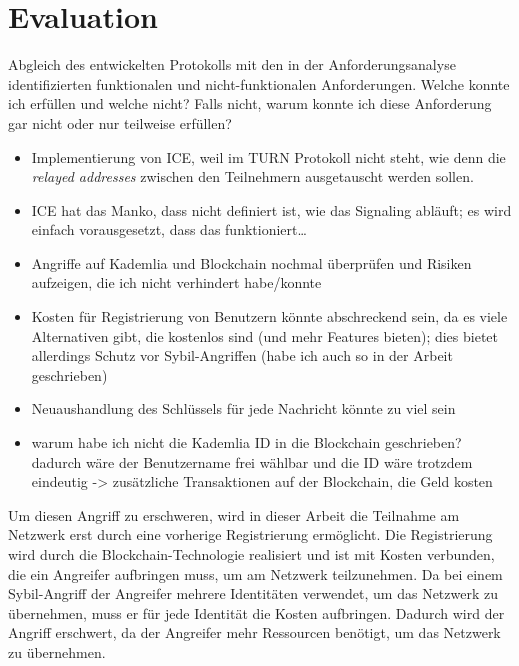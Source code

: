 \chapter{Evaluation}
\label{chap:evaluation}



Abgleich des entwickelten Protokolls mit den in der Anforderungsanalyse identifizierten funktionalen und
nicht-funktionalen Anforderungen. Welche konnte ich erfüllen und welche nicht? Falls nicht, warum
konnte ich diese Anforderung gar nicht oder nur teilweise erfüllen?

\begin{itemize}
    \item Implementierung von ICE, weil im TURN Protokoll nicht steht, wie denn die \textit{relayed addresses} zwischen den Teilnehmern ausgetauscht werden sollen.
    \item ICE hat das Manko, dass nicht definiert ist, wie das Signaling abläuft; es wird einfach vorausgesetzt, dass das funktioniert\dots
    \item Angriffe auf Kademlia und Blockchain nochmal überprüfen und Risiken aufzeigen, die ich nicht verhindert habe/konnte
    \item Kosten für Registrierung von Benutzern könnte abschreckend sein, da es viele Alternativen gibt, die kostenlos sind (und mehr Features bieten); dies bietet allerdings Schutz vor Sybil-Angriffen (habe ich auch so in der Arbeit geschrieben)
    \item Neuaushandlung des Schlüssels für jede Nachricht könnte zu viel sein
    \item warum habe ich nicht die Kademlia ID in die Blockchain geschrieben? dadurch wäre der Benutzername frei wählbar und die ID wäre trotzdem eindeutig -> zusätzliche Transaktionen auf der Blockchain, die Geld kosten
\end{itemize}


Um diesen Angriff zu erschweren, wird in dieser Arbeit die Teilnahme am Netzwerk erst durch eine vorherige Registrierung ermöglicht. Die Registrierung wird durch die Blockchain-Technologie realisiert und ist mit Kosten verbunden, die ein Angreifer aufbringen muss, um am Netzwerk teilzunehmen. Da bei einem Sybil-Angriff der Angreifer mehrere Identitäten verwendet, um das Netzwerk zu übernehmen, muss er für jede Identität die Kosten aufbringen. Dadurch wird der Angriff erschwert, da der Angreifer mehr Ressourcen benötigt, um das Netzwerk zu übernehmen.

